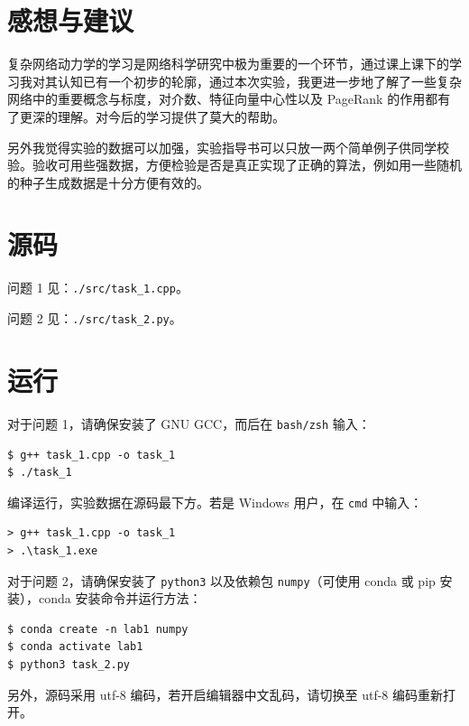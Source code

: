 \documentclass{article}
\begin{document}
\newpage

\section{感想与建议}

复杂网络动力学的学习是网络科学研究中极为重要的一个环节，通过课上课下的学习我对其认知已有一个初步的轮廓，通过本次实验，我更进一步地了解了一些复杂网络中的重要概念与标度，对介数、特征向量中心性以及 PageRank 的作用都有了更深的理解。对今后的学习提供了莫大的帮助。

另外我觉得实验的数据可以加强，实验指导书可以只放一两个简单例子供同学校验。验收可用些强数据，方便检验是否是真正实现了正确的算法，例如用一些随机的种子生成数据是十分方便有效的。

\section{源码}

问题 1 见：\lstinline{./src/task_1.cpp}。

问题 2 见：\lstinline{./src/task_2.py}。

\section{运行}

对于问题 1，请确保安装了 GNU GCC，而后在 \lstinline{bash/zsh} 输入：
\begin{lstlisting}
$ g++ task_1.cpp -o task_1
$ ./task_1
\end{lstlisting}
编译运行，实验数据在源码最下方。若是 Windows 用户，在 \lstinline{cmd} 中输入：
\begin{lstlisting}
> g++ task_1.cpp -o task_1
> .\task_1.exe
\end{lstlisting}

对于问题 2，请确保安装了 \lstinline{python3} 以及依赖包 \lstinline{numpy}（可使用 conda 或 pip 安装），conda 安装命令并运行方法：
\begin{lstlisting}
$ conda create -n lab1 numpy
$ conda activate lab1
$ python3 task_2.py
\end{lstlisting}

另外，源码采用 utf-8 编码，若开启编辑器中文乱码，请切换至 utf-8 编码重新打开。
\end{document}
